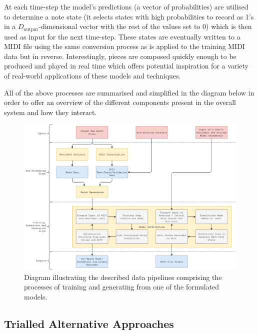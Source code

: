 \documentclass[12pt,]{article}
\begin{document}
At each time-step the model's predictions (a vector of probabilities)
are utilised to determine a note state (it selects states with high
probabilities to record as 1's in a \(D_{\text{output}}\)-dimensional
vector with the rest of the values set to 0) which is then used as input
for the next time-step. These states are eventually written to a MIDI
file using the same conversion process as is applied to the training
MIDI data but in reverse. Interestingly, pieces are composed quickly
enough to be produced and played in real time which offers potential
inspiration for a variety of real-world applications of these models and
techniques.

All of the above processes are summarised and simplified in the diagram
below in order to offer an overview of the different components present
in the overall system and how they interact.

\begin{figure}
\centering
\includegraphics{Images/processdiagram.png}
\caption{Diagram illustrating the described data pipelines comprising
the processes of training and generating from one of the formulated
models.}
\end{figure}

\hypertarget{trialled-alternative-approaches}{%
\subsection{Trialled Alternative
Approaches}\label{trialled-alternative-approaches}}
\end{document}
